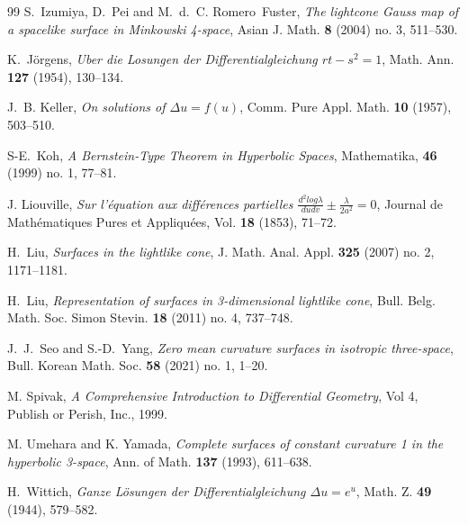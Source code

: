 \documentclass[12pt,reqno]{amsart}
\theoremstyle{plain} %
\theoremstyle{definition}
\numberwithin{equation}{section}
\begin{document}
\begin{thebibliography}{99}
	S.~Izumiya, D.~Pei and M.~d.~C. Romero~Fuster,
	\emph{The lightcone Gauss map of a spacelike surface in Minkowski 4-space},
	Asian J. Math. \textbf{8} (2004) no. 3, 511--530.

	K.~J\"orgens,
	\emph{Uber die Losungen der Differentialgleichung $rt-s^2=1$},
	Math. Ann. \textbf{127} (1954), 130--134.

	J.~B. Keller,
	\emph{On solutions of $\Delta u=f(u)$},
	Comm. Pure Appl. Math. \textbf{10} (1957), 503--510.

	S-E.~Koh,
	\emph{A Bernstein-Type Theorem in Hyperbolic Spaces},
	Mathematika, \textbf{46} (1999) no. 1, 77--81.

	J. Liouville,
	\emph{Sur l'\'{e}quation aux diff\'{e}rences partielles $\frac{d^2 log \lambda}{du dv} \pm \frac{\lambda}{2 a^2} = 0$}, Journal de Math\'{e}matiques Pures et Appliqu\'{e}es, Vol. \textbf{18} (1853), 71--72.

	H.~Liu,
	\emph{Surfaces in the lightlike cone},
	J. Math. Anal. Appl. \textbf{325} (2007) no. 2, 1171--1181.

	H.~Liu,
	\emph{Representation of surfaces in 3-dimensional lightlike cone},
	Bull. Belg. Math. Soc. Simon Stevin. \textbf{18} (2011) no. 4, 737--748.

	J.~J.~Seo and S.-D.~Yang,
	\emph{Zero mean curvature surfaces in isotropic three-space},
	Bull. Korean Math. Soc. \textbf{58} (2021) no. 1, 1--20.

	M. Spivak,
	\emph{A Comprehensive Introduction to Differential Geometry}, Vol 4,
	Publish or Perish, Inc., 1999.

	M. Umehara and K. Yamada,
	\emph{Complete surfaces of constant curvature 1 in the hyperbolic 3-space},
	Ann. of Math. \textbf{137} (1993), 611--638.

	H.~Wittich,
	\emph{Ganze L\"osungen der Differentialgleichung $\Delta u=e^u$},
	Math. Z. \textbf{49} (1944), 579--582.
\end{thebibliography}
\end{document}
